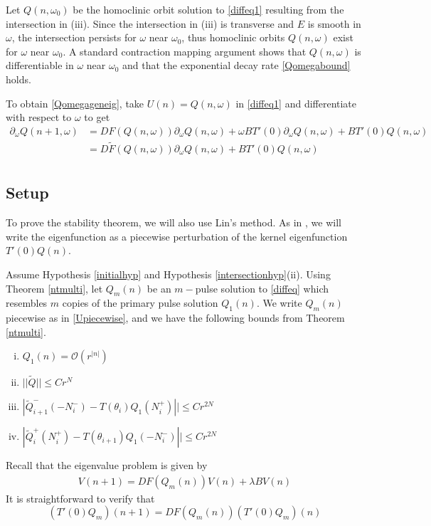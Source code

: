 \documentclass[12pt]{article}
\begin{document}
Let $Q(n, \omega_0)$ be the homoclinic orbit solution to \eqref{diffeq1} resulting from the intersection in (iii). Since the intersection in (iii) is transverse and $E$ is smooth in $\omega$, the intersection persists for $\omega$ near $\omega_0$, thus homoclinic orbits $Q(n, \omega)$ exist for $\omega$ near $\omega_0$. A standard contraction mapping argument shows that $Q(n, \omega)$ is differentiable in $\omega$ near $\omega_0$ and that the exponential decay rate \eqref{Qomegabound} holds.

To obtain \eqref{Qomegageneig}, take $U(n) = Q(n, \omega)$ in \eqref{diffeq1} and differentiate with respect to $\omega$ to get
\begin{align*}
\partial_\omega Q(n+1, \omega) &=
DF(Q(n, \omega))\partial_\omega Q(n, \omega) + \omega B T'(0) \partial_\omega Q(n, \omega) + B T'(0) Q(n, \omega) \\
&= D\tilde{F}(Q(n, \omega))\partial_\omega Q(n, \omega) + B T'(0) Q(n, \omega) \\
\end{align*}

\subsection{Setup}

To prove the stability theorem, we will also use Lin's method. As in \cite{Sandstede1998}, we will write the eigenfunction as a piecewise perturbation of the kernel eigenfunction $T'(0)Q(n)$. 

Assume Hypothesis \ref{initialhyp} and Hypothesis \ref{intersectionhyp}(ii). Using Theorem \ref{ntmulti}, let $Q_m(n)$ be an $m-$pulse solution to \eqref{diffeq} which resembles $m$ copies of the primary pulse solution $Q_1(n)$. We write $Q_m(n)$ piecewise as in \eqref{Upiecewise}, and we have the following bounds from Theorem \ref{ntmulti}.
\begin{enumerate}[(i)]
\item $Q_1(n) = \mathcal{O}(r^|n|)$
\item $||\tilde{Q}|| \leq C r^N$
\item $|\tilde{Q}_{i+1}^-(-N_i^-) - T(\theta_i) Q_1(N_i^+)|| \leq C r^{2N}$ 
\item $|\tilde{Q}_i^+(N_i^+) - T(\theta_{i+1}) Q_1(-N_i^-)|| \leq C r^{2N}$
\end{enumerate}

Recall that the eigenvalue problem is given by 
\begin{align*}
V(n+1) = DF(Q_m(n)) V(n) + \lambda B V(n)
\end{align*}
It is straightforward to verify that 
\begin{equation}\label{DFkernel1}
(T'(0)Q_m)(n+1) = DF(Q_m(n))(T'(0)Q_m)(n)
\end{equation}
\end{document}
